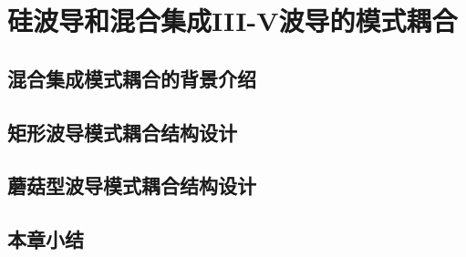 \chapter{硅波导和混合集成III-V波导的模式耦合}
\section{混合集成模式耦合的背景介绍}
\section{矩形波导模式耦合结构设计}
\section{蘑菇型波导模式耦合结构设计}
\section{本章小结}